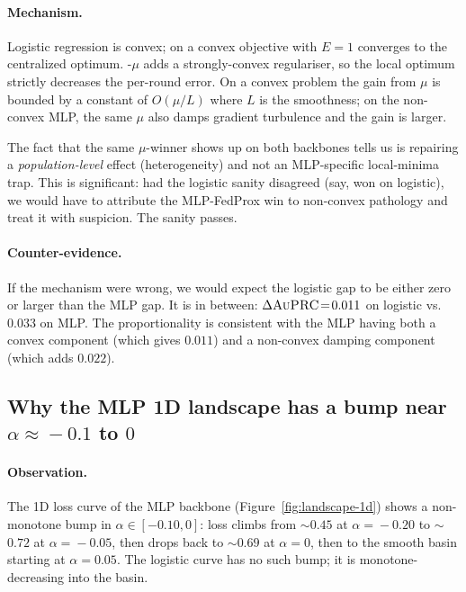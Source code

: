 \paragraph{Mechanism.} Logistic regression is convex; \fedavg{} on a convex
objective with $E\!=\!1$ converges to the centralized optimum. \fedprox{}-$\mu$
adds a strongly-convex regulariser, so the local optimum strictly decreases
the per-round error. On a convex problem the gain from $\mu$ is bounded by
a constant of $O(\mu/L)$ where $L$ is the smoothness; on the non-convex MLP,
the same $\mu$ also damps gradient turbulence and the gain is larger.

The fact that the same $\mu$-winner shows up on both backbones tells us
\fedprox{} is repairing a \emph{population-level} effect (heterogeneity) and
not an MLP-specific local-minima trap. This is significant: had the logistic
sanity disagreed (say, \fedavg{} won on logistic), we would have to attribute
the MLP-FedProx win to non-convex pathology and treat it with suspicion. The
sanity passes.

\paragraph{Counter-evidence.} If the mechanism were wrong, we would expect the
logistic gap to be either zero or larger than the MLP gap. It is in between:
$\Delta\textsc{AuPRC}{}\!=\!0.011$ on logistic vs.\ $0.033$ on MLP. The proportionality
is consistent with the MLP having both a convex \fedprox{} component (which
gives $0.011$) and a non-convex damping component (which adds $0.022$).

\subsection{Why the MLP 1D landscape has a bump near $\alpha\!\approx\!-0.1$ to $0$}
\label{sec:mechanism-landscape}

\paragraph{Observation.} The 1D loss curve of the MLP backbone
(Figure~\ref{fig:landscape-1d}) shows a non-monotone bump in
$\alpha \in [-0.10, 0]$: loss climbs from $\sim$$0.45$ at $\alpha\!=\!-0.20$ to
$\sim$$0.72$ at $\alpha\!=\!-0.05$, then drops back to $\sim$$0.69$ at
$\alpha\!=\!0$, then to the smooth basin starting at $\alpha\!=\!0.05$. The
logistic curve has no such bump; it is monotone-decreasing into the basin.

